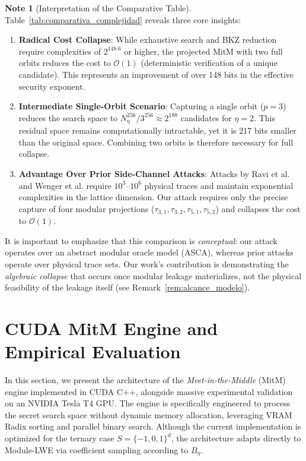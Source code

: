 \documentclass[11pt,a4paper]{article}
\theoremstyle{plain}
\theoremstyle{definition}
\newtheorem{remark}[teorema]{Note}
\numberwithin{equation}{section}
\newcommand{\cO}{\mathcal{O}}
\begin{document}
\begin{remark}[Interpretation of the Comparative Table]
\label{rem:interpretacion_tabla}
Table~\ref{tab:comparativa_complejidad} reveals three core insights:
\begin{enumerate}
    \item \textbf{Radical Cost Collapse}: While exhaustive search and BKZ reduction require complexities of $2^{148.6}$ or higher, the projected MitM with two full orbits reduces the cost to $\cO(1)$ (deterministic verification of a unique candidate). This represents an improvement of over 148 bits in the effective security exponent.
    \item \textbf{Intermediate Single-Orbit Scenario}: Capturing a single orbit ($p=3$) reduces the search space to $N_\eta^{256}/3^{256} \approx 2^{188}$ candidates for $\eta=2$. This residual space remains computationally intractable, yet it is 217 bits smaller than the original space. Combining two orbits is therefore necessary for full collapse.
    \item \textbf{Advantage Over Prior Side-Channel Attacks}: Attacks by Ravi et al. \cite{Ravi2020} and Wenger et al. \cite{Wenger2024} require $10^3$--$10^6$ physical traces and maintain exponential complexities in the lattice dimension. Our attack requires only the precise capture of four modular projections ($\tau_{3,1}, \tau_{3,2}, \tau_{5,1}, \tau_{5,2}$) and collapses the cost to $\cO(1)$.
\end{enumerate}
It is important to emphasize that this comparison is \emph{conceptual}: our attack operates over an abstract modular oracle model (ASCA), whereas prior attacks operate over physical trace sets. Our work's contribution is demonstrating the \emph{algebraic collapse} that occurs once modular leakage materializes, not the physical feasibility of the leakage itself (see Remark~\ref{rem:alcance_modelo}).
\end{remark}

\section{CUDA MitM Engine and Empirical Evaluation}
\label{sec:cuda_mitm}

In this section, we present the architecture of the \emph{Meet-in-the-Middle} (MitM) engine implemented in CUDA C++, alongside massive experimental validation on an NVIDIA Tesla T4 GPU. The engine is specifically engineered to process the secret search space without dynamic memory allocation, leveraging VRAM Radix sorting and parallel binary search. Although the current implementation is optimized for the ternary case $S = \{-1,0,1\}^d$, the architecture adapts directly to Module-LWE via coefficient sampling according to $B_\eta$.
\end{document}
